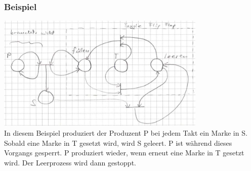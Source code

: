 \vspace*{-1cm}
\subsubsection{Beispiel}
\includegraphics[width=10cm]{images/Concurrency/Petri3}\\
In diesem Beispiel produziert der Produzent P bei jedem Takt ein Marke in S. Sobald eine Marke in T gesetzt wird, wird S geleert. P ist während dieses Vorgangs gesperrt. P produziert wieder, wenn erneut eine Marke in T gesetzt wird. Der Leerprozess wird dann gestoppt.

